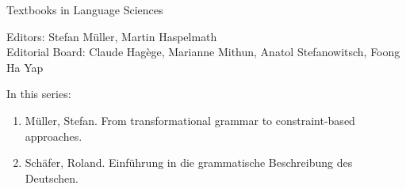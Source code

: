 {\large Textbooks in Language Sciences}

\bigskip

Editors: Stefan Müller, Martin Haspelmath  \\
Editorial Board: Claude Hagège, Marianne Mithun, Anatol Stefanowitsch, Foong Ha Yap

\bigskip

In this series:

\begin{enumerate}
\item Müller, Stefan. From transformational grammar to constraint-based approaches.
\item  Schäfer, Roland. Einführung in die grammatische Beschreibung des Deutschen.
\end{enumerate}



